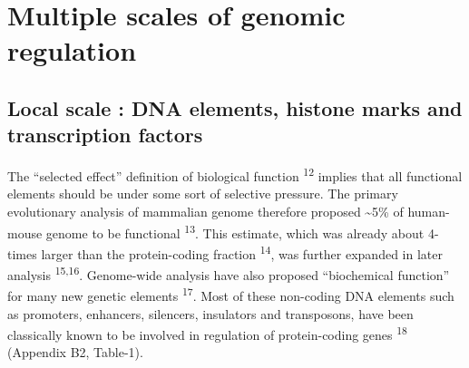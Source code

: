 \documentclass[11pt,twoside]{MPIthesis}
\theoremstyle{definition}
\theoremstyle{definition}
\theoremstyle{definition}
\theoremstyle{remark}
\begin{document}
\section{Multiple scales of genomic
regulation}\label{multiple-scales-of-genomic-regulation}

\subsection{Local scale : DNA elements, histone marks and transcription
factors}\label{local-scale-dna-elements-histone-marks-and-transcription-factors}

The ``selected effect'' definition of biological function
\textsuperscript{12} implies that all functional elements should be
under some sort of selective pressure. The primary evolutionary analysis
of mammalian genome therefore proposed \textasciitilde{}5\% of
human-mouse genome to be functional \textsuperscript{13}. This estimate,
which was already about 4-times larger than the protein-coding fraction
\textsuperscript{14}, was further expanded in later analysis
\textsuperscript{15,16}. Genome-wide analysis have also proposed
``biochemical function'' for many new genetic elements
\textsuperscript{17}. Most of these non-coding DNA elements such as
promoters, enhancers, silencers, insulators and transposons, have been
classically known to be involved in regulation of protein-coding genes
\textsuperscript{18} (Appendix B2, Table-1).
\end{document}
